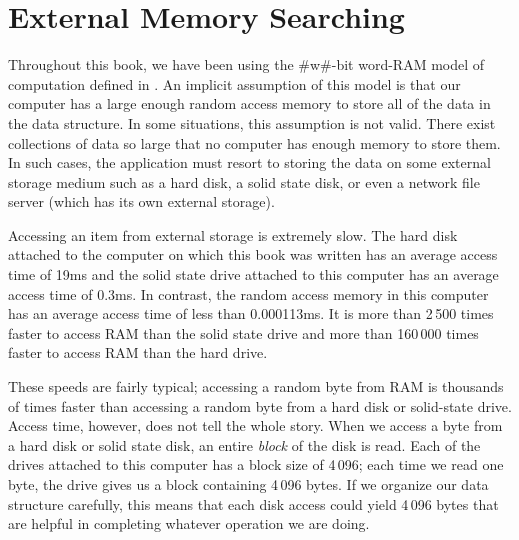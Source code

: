 \chapter{External Memory Searching}

Throughout this book, we have been using the #w#-bit word-RAM model
of computation defined in .   An implicit assumption of
this model is that our computer has a large enough random access memory
to store all of the data in the data structure.  In some situations,
this assumption is not valid.  There exist collections of data so large
that no computer has enough memory to store them.  In such cases, the
application must resort to storing the data on some external storage
medium such as a hard disk, a solid state disk, or even a network file
server (which has its own external storage).

Accessing an item from external storage is extremely slow.  The hard
disk attached to the computer on which this book was written has an
average access time of 19ms and the solid state drive attached to this
computer has an average access time of 0.3ms.  In contrast, the random
access memory in this computer has an average access time of less than
0.000113ms.  It is more than 2\,500 times faster to access RAM than the
solid state drive and more than 160\,000 times faster to access RAM than
the hard drive.

% 
% 

These speeds are fairly typical;  accessing a random byte from RAM is
thousands of times faster than accessing a random byte from a hard disk
or solid-state drive.  Access time, however, does not tell the whole
story.  When we access a byte from a hard disk or solid state disk, an
entire \emph{block}
of the disk is read.  Each of the drives attached
to this computer has a block size of 4\,096; each time we read one byte,
the drive gives us a block containing 4\,096 bytes.  If we organize our
data structure carefully, this means that each disk access could yield
4\,096 bytes that are helpful in completing whatever operation we are doing.

